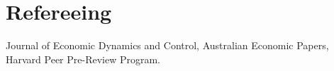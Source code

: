 \documentclass[letterpaper,11pt]{article}
\makeatletter
\newcommand{\resumeSubheading}[4]{
  \vspace{-1pt}\item
    \begin{tabular*}{0.97\textwidth}{l@{\extracolsep{\fill}}r}
      \textbf{#1} & #2 \\
      \textit{\small#3} & \textit{\small #4} \\
    \end{tabular*}\vspace{-5pt}
}
\newcommand{\resumeSubHeadingListStart}{\begin{itemize}[leftmargin=*]}
\newcommand{\resumeSubHeadingListEnd}{\end{itemize}}
\makeatother
\begin{document}
%
      

      
      
      
      
      
      
      
      
      
      
      


\section{Refereeing}
\begin{description}[font=$\bullet$]
\item {Journal of Economic Dynamics and Control, Australian Economic Papers, Harvard Peer Pre-Review Program.} 
\end{description}

\end{document}
